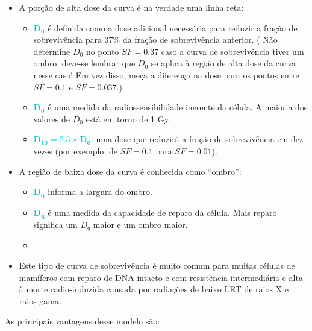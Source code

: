 \documentclass[11pt,a4paper]{article}
\newcounter{exemplo}
\begin{document}
	\begin{itemize}
		\item A porção de alta dose da curva é na verdade uma linha reta:
		
		\begin{itemize}[label=\textcolor{CarnationPink}{$\star$}]
			\item \textcolor{DarkTurquoise}{$\mathbf{D_0}$} é definida como a dose adicional necessária para reduzir a fração de sobrevivência para 37\% da fração de sobrevivência anterior. (\textcolor{MediumOrchid}{\textbf{}} Não determine $D_0$ no ponto $SF = 0.37$ caso a curva de sobrevivência tiver um ombro, deve-se lembrar que $D_0$ se aplica à região de alta dose da curva nesse caso! Em vez disso, meça a diferença na dose para os pontos entre $SF = 0.1$ e $SF = 0.037$.)
		
			\item \textcolor{DarkTurquoise}{$\mathbf{D_0}$} é uma medida da radiossensibilidade inerente da célula. A maioria dos valores de $D_0$ está em torno de 1 Gy.
		
			\item \textcolor{DarkTurquoise}{$\mathbf{D_{10} = 2.3 \times D_0}$:} uma dose que reduzirá a fração de sobrevivência em dez vezes (por exemplo, de $SF = 0.1$ para $SF = 0.01$).
		\end{itemize}

		\item A região de baixa dose da curva é conhecida como “ombro”:
		\begin{itemize}[label=\textcolor{CarnationPink}{$\star$}]
			\item \textcolor{DarkTurquoise}{$\mathbf{D_q}$} informa a largura do ombro.
			\item \textcolor{DarkTurquoise}{$\mathbf{D_q}$} é uma medida da capacidade de reparo da célula. Mais reparo significa um $D_q$ maior e um ombro maior.
			\item 
		\end{itemize}

		\item Este tipo de curva de sobrevivência é muito comum para muitas células de mamíferos com reparo de DNA intacto e com resistência intermediária e alta à morte radio-induzida causada por radiações de baixo LET de raios X e raios gama.
	\end{itemize}

	  As principais vantagens desse modelo são:
\end{document}
